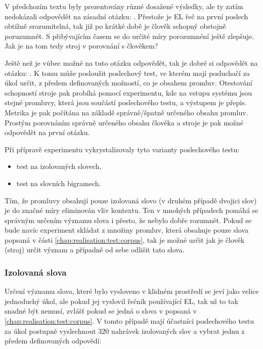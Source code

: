 V předchozím textu byly prezentovány různé dosažené výsledky, ale ty zatím nedokázali odpovědět na zásadní otázku: . Přestože je EL řeč na první poslech obtížně srozumitelná, tak již po krátké době je člověk schopný obstojně poruzumnět. S přibývajícím časem se do určité míry porozumnéní ještě zlepšuje. Jak je na tom tedy stroj v porovnání s člověkem?

Ještě než je vůbec možné na tuto otázku odpovědět, tak je dobré si odpovědět na otázku: . K tomu může posloužit poslechový test, ve kterém mají posluchačí za úkol určit, z předem definovaných možností, co je obsahem promluv. Otestování schopností stroje pak probíhá pomocí experimentu, kde na vstupu systému jsou stejné promluvy, která jsou součástí poslechového testu, a výstupem je přepis. Metrika je pak počítána na základě správně/špatně určeného obsahu promluv. Prostým porovnáním správně určeného obsahu člověka a stroje je pak možné odpovědět na první  otázku.

Při přípravě experimentu vykrystalizovaly tyto varianty poslechového testu:

\begin{itemize}
  \item test na izolovaných slovech,
  \item test na slovních bigramech.
\end{itemize}

\noindent Tím, že promluvy obsahují pouze izolovaná slovo (v druhém případě dvojici slov) je do značné míry eliminován vliv kontextu. Ten v mnohých případech pomáhá se správným určením významu slova i přesto, že nebylo dobře rozumnět. Pokud se bude navíc experiment skládat z množiny promluv, která obsahuje pouze slova popsaná v části \ref{chap:realisation:test:corpus}, tak je možné  určit jak  je člověk (stroj) určit význam a případně od sebe odlišit tato slova.

\subsubsection{Izolovaná slova}

Určení významu slova, které bylo vysloveno v klidném prostředí se jeví jako velice jednoduchý úkol, ale pokud jej vyslovil řečník používající EL, tak už to tak snadné být nemusí, zvlášť pokud se jedná o slova v popsaná v \ref{chap:realisation:test:corpus}. V tomto případě mají účastníci poslechového testu za úkol postupně vyslechnout $320$ nahrávek izolovaných slov a vybrat jednu z předem definovaných odpovědí:

